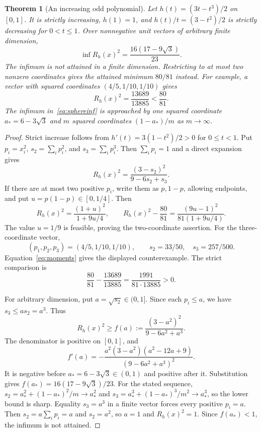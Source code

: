 \documentclass[11pt]{article}
\newtheorem{theorem}{Theorem}
\begin{document}
\begin{theorem}[An increasing odd polynomial]\label{thm:sphere}
Let $h(t)=(3t-t^3)/2$ on $[0,1]$. It is strictly increasing,
$h(1)=1$, and $h(t)/t=(3-t^2)/2$ is strictly decreasing for $0<t\le1$.
Over nonnegative unit vectors of arbitrary finite dimension,
\begin{equation}\label{eq:sphereinf}
\inf R_h(x)^2=\frac{16(17-9\sqrt3)}{23}.
\end{equation}
The infimum is not attained in a finite dimension. Restricting to at most
two nonzero coordinates gives the attained minimum $80/81$ instead.
For example, a vector with squared coordinates $(4/5,1/10,1/10)$ gives
\[
R_h(x)^2=\frac{13689}{13885}<\frac{80}{81}.
\]
The infimum in~\eqref{eq:sphereinf} is approached by one squared coordinate
$a_*=6-3\sqrt3$ and $m$ squared coordinates $(1-a_*)/m$ as $m\to\infty$.
\end{theorem}
\begin{proof}
Strict increase follows from $h'(t)=3(1-t^2)/2>0$ for $0\le t<1$.
Put $p_i=x_i^2$, $s_2=\sum_i p_i^2$, and $s_3=\sum_i p_i^3$.
Then $\sum_i p_i=1$ and a direct expansion gives
\begin{equation}\label{eq:moments}
R_h(x)^2=\frac{(3-s_2)^2}{9-6s_2+s_3}.
\end{equation}
If there are at most two positive $p_i$, write them as $p,1-p$,
allowing endpoints, and put $u=p(1-p)\in[0,1/4]$. Then
\[
R_h(x)^2=\frac{(1+u)^2}{1+9u/4},\qquad
R_h(x)^2-\frac{80}{81}
=\frac{(9u-1)^2}{81(1+9u/4)}.
\]
The value $u=1/9$ is feasible, proving the two-coordinate assertion.
For the three-coordinate vector,
\[
(p_1,p_2,p_3)=(4/5,1/10,1/10),\qquad s_2=33/50,\quad s_3=257/500.
\]
Equation~\eqref{eq:moments} gives the displayed counterexample.
The strict comparison is
\[
\frac{80}{81}-\frac{13689}{13885}=\frac{1991}{81\cdot13885}>0.
\]

For arbitrary dimension, put $a=\sqrt{s_2}\in(0,1]$.
Since each $p_i\le a$, we have $s_3\le a s_2=a^3$. Thus
\[
R_h(x)^2\ge f(a):=\frac{(3-a^2)^2}{9-6a^2+a^3}.
\]
The denominator is positive on $[0,1]$, and
\[
f'(a)=-\frac{a^2(3-a^2)(a^2-12a+9)}{(9-6a^2+a^3)^2}.
\]
It is negative before $a_*=6-3\sqrt3\in(0,1)$ and positive after it.
Substitution gives $f(a_*)=16(17-9\sqrt3)/23$.
For the stated sequence,
$s_2=a_*^2+(1-a_*)^2/m\to a_*^2$ and
$s_3=a_*^3+(1-a_*)^3/m^2\to a_*^3$, so the lower bound is sharp.
Equality $s_3=a^3$ in a finite vector forces every positive $p_i=a$.
Then $s_2=a\sum_i p_i=a$ and $s_2=a^2$, so $a=1$ and $R_h(x)^2=1$.
Since $f(a_*)<1$, the infimum is not attained.
\end{proof}
\end{document}
